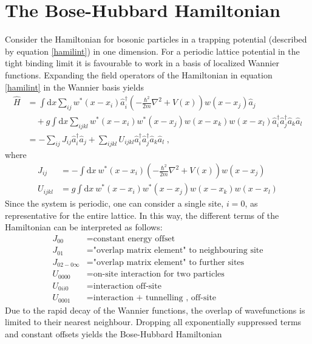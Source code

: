 \section{The Bose-Hubbard Hamiltonian}
Consider the Hamiltonian for bosonic particles in a trapping potential (described by equation \eqref{hamilint}) in one dimension. For a periodic lattice potential in the tight binding limit it is favourable to work in a basis of localized Wannier functions. Expanding the field operators of the Hamiltonian in equation \eqref{hamilint} in  the Wannier basis yields \cite{Jaksch}
\begin{align}
	\hat{H} &= \int \mathrm{d}x \sum_{i j} w^*(x-x_i) \hat{a}_{i}^{\dag} \left( - \frac{\hbar^2}{2 m} \nabla ^2 + V(x) \right) w(x-x_j) \hat{a}_j \nonumber \\
	& \quad + g \int \mathrm{d}x \sum_{i j k l} w^*(x-x_i) w^*(x-x_j) w(x-x_k) w(x-x_l) \hat{a}_{i}^{\dag} \hat{a}_{j}^{\dag} \hat{a}_{k} \hat{a}_{l} \\
	&= - \sum_{i j } J_{i j} \hat{a}_{i}^{\dag} \hat{a}_{j} + \sum_{i j k l} U_{i j k l} \hat{a}_{i}^{\dag} \hat{a}_{j}^{\dag} \hat{a}_{k} \hat{a}_{l} \; ,
\end{align}
where
\begin{align}
	J_{i j} &= - \int \mathrm{d}x \ w^*(x-x_i) \left( - \frac{\hbar^2}{2 m} \nabla ^2 + V(x) \right) w(x-x_j) \\
	U_{i j k l} &= g \int \mathrm{d}x \ w^*(x-x_i) w^*(x-x_j) w(x-x_k) w(x-x_l) 
	\label{eq:BHparamJ}
\end{align}
Since the system is periodic, one can consider a single site, $i = 0$, as representative for the entire lattice. In this way, the different terms of the Hamiltonian can be interpreted as follows:
\begin{align}
	J_{0 0} &= \text{constant energy offset} \nonumber \\
	J_{0 1} &= \text{"overlap matrix element" to neighbouring site} \nonumber \\
	J_{0 2 - 0 \infty} &= \text{"overlap matrix element" to further sites} \nonumber \\
	U_{0 0 0 0} &= \text{on-site interaction for two particles} \nonumber \\
	U_{0 i i 0} &= \text{interaction off-site} \nonumber \\
	U_{0 0 0 1} &= \text{interaction  + tunnelling , off-site} \nonumber 
\end{align}
Due to the rapid decay of the Wannier functions, the overlap of wavefunctions is limited to their nearest neighbour. Dropping all exponentially suppressed terms and constant offsets yields the Bose-Hubbard Hamiltonian

